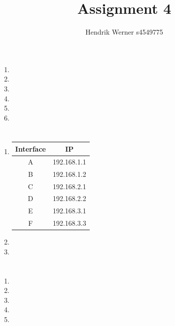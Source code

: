 \documentclass[12pt, a4paper]{article}
\title{Assignment 4}
\author{Hendrik Werner s4549775}
\begin{document}
\maketitle

\section{} %
\begin{enumerate}[a]
	\item %
	\item %
	\item %
	\item %
	\item %
	\item %
\end{enumerate}

\section{} %
\begin{enumerate}
	\item %
	\begin{tabular}{|c|c|}
		\hline
		Interface & IP\\\hline
		A & 192.168.1.1\\\hline
		B & 192.168.1.2\\\hline
		C & 192.168.2.1\\\hline
		D & 192.168.2.2\\\hline
		E & 192.168.3.1\\\hline
		F & 192.168.3.3\\\hline
	\end{tabular}

	\item %
	\item %
\end{enumerate}

\section{} %

\section{} %
\begin{enumerate}
	\item %
	\item %
	\item %
	\item %
	\item %
\end{enumerate}
\end{document}
